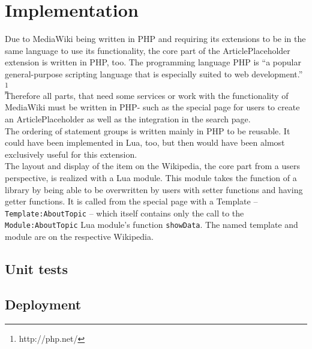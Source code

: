 \chapter{Implementation}
	
	Due to MediaWiki being written in PHP and requiring its extensions to be in the same language to use its functionality, the core part of the ArticlePlaceholder extension is written in PHP, too. The programming language PHP is ``a popular general-purpose scripting language that is especially suited to web development.'' \footnote{http://php.net/} \\
	Therefore all parts, that need some services or work with the functionality of MediaWiki must be written in PHP- such as the special page for users to create an ArticlePlaceholder as well as the integration in the search page. \\
	The ordering of statement groups is written mainly in PHP to be reusable. It could have been implemented in Lua, too, but then would have been almost exclusively useful for this extension. \\
	The layout and display of the item on the Wikipedia, the core part from a users perspective, is realized with a Lua module. This module takes the function of a library by being able to be overwritten by users with setter functions and having getter functions. It is called from the special page with a Template -- \texttt{Template:AboutTopic} -- which itself contains only the call to the \texttt{Module:AboutTopic} Lua module's function \texttt{showData}. The named template and module are on the respective Wikipedia. \\

	
	
	
	
	
	
	
	\section{Unit tests}
	\section{Deployment}
	